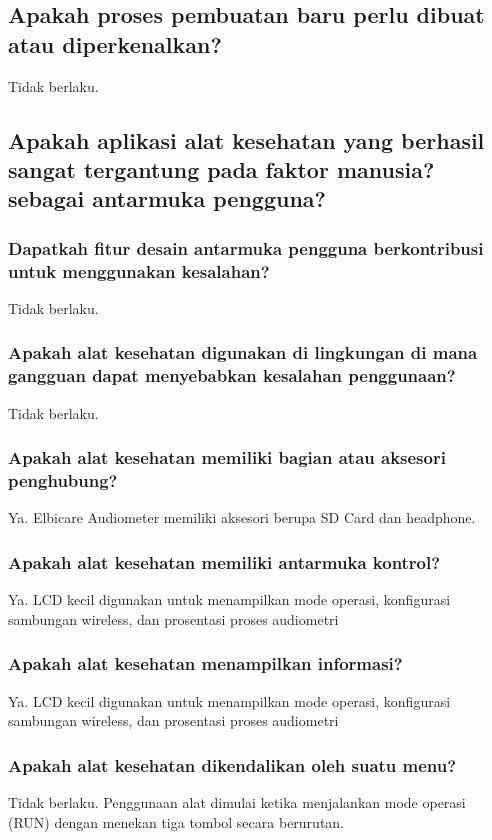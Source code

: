 \documentclass[11pt,a4paper,twoside,onecolumn]{book}
\begin{document}
			\subsection{Apakah proses pembuatan baru perlu dibuat atau diperkenalkan?}
			Tidak berlaku.
			
			\subsection{Apakah aplikasi alat kesehatan yang berhasil sangat tergantung pada faktor manusia? sebagai antarmuka pengguna?}
			
				\subsubsection{Dapatkah fitur desain antarmuka pengguna berkontribusi untuk menggunakan kesalahan?}
				Tidak berlaku.
				
				\subsubsection{Apakah alat kesehatan digunakan di lingkungan di mana gangguan dapat menyebabkan kesalahan penggunaan?}
				Tidak berlaku.
				
				\subsubsection{Apakah alat kesehatan memiliki bagian atau aksesori penghubung?}
				Ya. Elbicare Audiometer memiliki aksesori berupa SD Card dan headphone. 
				
				\subsubsection{Apakah alat kesehatan memiliki antarmuka kontrol?}
				Ya. LCD kecil digunakan untuk menampilkan mode operasi, konfigurasi sambungan wireless, dan prosentasi proses audiometri
				
				\subsubsection{Apakah alat kesehatan menampilkan informasi?}
				Ya. LCD kecil digunakan untuk menampilkan mode operasi, konfigurasi sambungan wireless, dan prosentasi proses audiometri
				
				\subsubsection{Apakah alat kesehatan dikendalikan oleh suatu menu?}
				Tidak berlaku. Penggunaan alat dimulai ketika menjalankan mode operasi (RUN) dengan menekan tiga tombol secara berurutan. 
				
\end{document}
